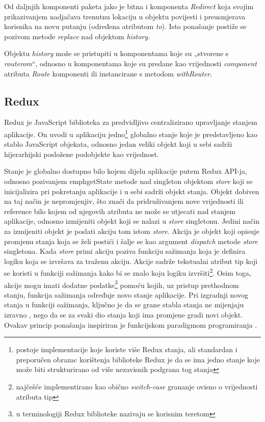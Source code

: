 \documentclass[times, utf8, diplomski, numeric]{fer}
\newcommand{\razmaks}{\vspace{10pt}}
\begin{document}
Od daljnjih komponenti paketa jako je bitna i komponenta \emph{Redirect} koja svojim prikazivanjem nadjačava trenutnu lokaciju u objektu povijesti i preusmjerava korisnika na novu putanju (određena atributom \emph{to}).
Isto ponašanje postiže se pozivom metode \emph{replace} nad objektom \emph{history}.

Objektu \emph{history} može se pristupiti u komponentama koje su „stvorene s \emph{routerom}“, odnosno u komponentama koje su predane kao vrijednosti \emph{component} atributa \emph{Route} komponenti ili instancirane s metodom \emph{withRouter}.


\razmaks
\subsection{Redux}

Redux je JavaScript biblioteka za predvidljivo centralizirano upravljanje stanjem aplikacije.
On uvodi u aplikaciju jedno\footnote{
    postoje implementacije koje koriste više Redux stanja, ali standardan i preporučen obrazac korištenja biblioteke Redux je da se ima jedno stanje koje može biti strukturirano od više nezavisnih podgrana tog stanja
} globalno stanje koje je predstavljeno kao stablo JavaScript objekata, odnosno jedan veliki objekt koji u sebi sadrži hijerarhijski posložene podobjekte kao vrijednost.

Stanje je globalno dostupno bilo kojem dijelu aplikacije putem Redux API-ja, odnosno pozivanjem emph{getState} metode nad singleton objektom \emph{store} koji se inicijalizira pri pokretanju aplikacije i u sebi sadrži objekt stanja. 
Objekt dobiven na taj način je nepromjenjiv, što znači da pridruživanjem nove vrijednosti ili reference bilo kojem od njegovih atributa ne može se utjecati nad stanjem aplikacije, odnosno izmijeniti objekt koji se nalazi u \emph{store} singletonu.
Jedini način za izmijeniti objekt je poslati  akciju tom istom \emph{store}.
Akcija  je objekt koji opisuje promjenu stanja koja se želi postići i šalje se kao argument \emph{dispatch} metode \emph{store} singletona.
Kada \emph{store} primi akciju poziva funkciju sažimanja  koja je definira logiku koja se izvršava za traženu akciju.
Akcije sadrže tekstualni atribut tip  koji se koristi u funkciji sažimanja kako bi se znalo koju logiku izvršiti\footnote{
    najčešće implementirano kao obično \emph{switch-case} grananje ovisno o vrijednosti atributa tip
}.
Osim toga, akcije mogu imati dodatne podatke\footnote{
    u terminologiji Redux biblioteke nazivaju se korisnim teretom 
} pomoću kojih, uz pristup prethodnom stanju, funkcija sažimanja određuje novo stanje aplikacije.
Pri izgradnji novog stanja u funkciji sažimanja, ključno je da se grane stabla stanja ne mijenjaju izravno , nego da se za svaki dio stanja koji ima promjene gradi novi objekt.
Ovakav princip ponašanja inspiriran je funkcijskom paradigmom programiranja \citep{redux}.
\end{document}
